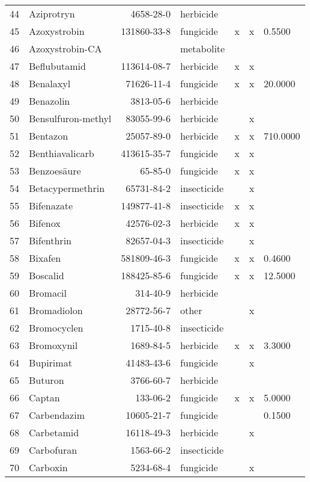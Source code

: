 \begin{longtable}{lp{4cm}rlp{1.3cm}p{1.3cm}p{1.5cm}}
  44 & Aziprotryn & 4658-28-0 & herbicide &  &  &  \\ 
  45 & Azoxystrobin & 131860-33-8 & fungicide & x & x & 0.5500 \\ 
  46 & Azoxystrobin-CA &  & metabolite &  &  &  \\ 
  47 & Beflubutamid & 113614-08-7 & herbicide & x & x &  \\ 
  48 & Benalaxyl & 71626-11-4 & fungicide & x & x & 20.0000 \\ 
  49 & Benazolin & 3813-05-6 & herbicide &  &  &  \\ 
  50 & Bensulfuron-methyl & 83055-99-6 & herbicide &  & x &  \\ 
  51 & Bentazon & 25057-89-0 & herbicide & x & x & 710.0000 \\ 
  52 & Benthiavalicarb & 413615-35-7 & fungicide & x & x &  \\ 
  53 & Benzoesäure & 65-85-0 & fungicide & x & x &  \\ 
  54 & Betacypermethrin & 65731-84-2 & insecticide &  & x &  \\ 
  55 & Bifenazate & 149877-41-8 & insecticide & x & x &  \\ 
  56 & Bifenox & 42576-02-3 & herbicide & x & x &  \\ 
  57 & Bifenthrin & 82657-04-3 & insecticide &  & x &  \\ 
  58 & Bixafen & 581809-46-3 & fungicide & x & x & 0.4600 \\ 
  59 & Boscalid & 188425-85-6 & fungicide & x & x & 12.5000 \\ 
  60 & Bromacil & 314-40-9 & herbicide &  &  &  \\ 
  61 & Bromadiolon & 28772-56-7 & other &  & x &  \\ 
  62 & Bromocyclen & 1715-40-8 & insecticide &  &  &  \\ 
  63 & Bromoxynil & 1689-84-5 & herbicide & x & x & 3.3000 \\ 
  64 & Bupirimat & 41483-43-6 & fungicide &  & x &  \\ 
  65 & Buturon & 3766-60-7 & herbicide &  &  &  \\ 
  66 & Captan & 133-06-2 & fungicide & x & x & 5.0000 \\ 
  67 & Carbendazim & 10605-21-7 & fungicide &  &  & 0.1500 \\ 
  68 & Carbetamid & 16118-49-3 & herbicide &  & x &  \\ 
  69 & Carbofuran & 1563-66-2 & insecticide &  &  &  \\ 
  70 & Carboxin & 5234-68-4 & fungicide &  & x &  \\ 

\end{longtable}
